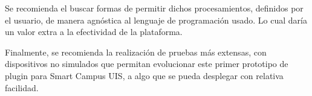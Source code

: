 Se recomienda el buscar formas de permitir dichos procesamientos, definidos por el usuario, de manera agnóstica al lenguaje de programación usado. Lo cual daría un valor extra a la efectividad de la plataforma.

Finalmente, se recomienda la realización de pruebas más extensas, con dispositivos no simulados que permitan evolucionar este primer prototipo de plugin para Smart Campus UIS, a algo que se pueda desplegar con relativa facilidad.

